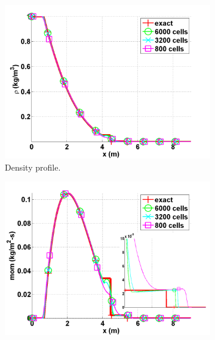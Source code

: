 \begin{figure}[H]
        \centering
        \begin{subfigure}[b]{0.495\textwidth}
                \centering
                \includegraphics[scale=.50]{figures/Leblanc_exact_and_numerical_stt_density_6000.png}
                \caption{Density profile.}
                \label{fig:1d_leblanc_vel}
        \end{subfigure}%
        \begin{subfigure}[b]{0.495\textwidth}
                \centering
                \includegraphics[scale=.50]{figures/Leblanc_exact_and_numerical_stt_momentum_6000.png}

\end{subfigure}
\end{figure}
